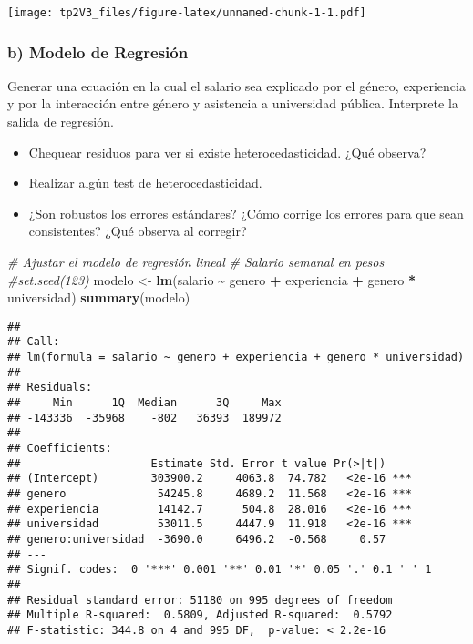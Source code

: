 \documentclass[
]{article}
\newenvironment{Shaded}{\begin{snugshade}}{\end{snugshade}}
\newcommand{\CommentTok}[1]{\textcolor[rgb]{0.56,0.35,0.01}{\textit{#1}}}
\newcommand{\FunctionTok}[1]{\textcolor[rgb]{0.13,0.29,0.53}{\textbf{#1}}}
\newcommand{\NormalTok}[1]{#1}
\newcommand{\OtherTok}[1]{\textcolor[rgb]{0.56,0.35,0.01}{#1}}
\newcommand{\SpecialCharTok}[1]{\textcolor[rgb]{0.81,0.36,0.00}{\textbf{#1}}}
\providecommand{\tightlist}{%
  \setlength{\itemsep}{0pt}\setlength{\parskip}{0pt}}
\begin{document}
\texttt{[image: tp2V3\_files/figure-latex/unnamed-chunk-1-1.pdf]}

\subsubsection{\texorpdfstring{\textbf{b) Modelo de
Regresión}}{b) Modelo de Regresión}}\label{b-modelo-de-regresiuxf3n}

Generar una ecuación en la cual el salario sea explicado por el género,
experiencia y por la interacción entre género y asistencia a universidad
pública. Interprete la salida de regresión.

\begin{itemize}
\tightlist
\item
  Chequear residuos para ver si existe heterocedasticidad. ¿Qué observa?
\item
  Realizar algún test de heterocedasticidad.
\item
  ¿Son robustos los errores estándares? ¿Cómo corrige los errores para
  que sean consistentes? ¿Qué observa al corregir?
\end{itemize}

\begin{Shaded}
\begin{Highlighting}[]
\CommentTok{\# Ajustar el modelo de regresión lineal}
\CommentTok{\# Salario semanal en pesos}
\CommentTok{\#set.seed(123)}
\NormalTok{modelo }\OtherTok{\textless{}{-}} \FunctionTok{lm}\NormalTok{(salario }\SpecialCharTok{\textasciitilde{}}\NormalTok{ genero }\SpecialCharTok{+}\NormalTok{ experiencia }\SpecialCharTok{+}\NormalTok{ genero }\SpecialCharTok{*}\NormalTok{ universidad)}
\FunctionTok{summary}\NormalTok{(modelo)}
\end{Highlighting}
\end{Shaded}

\begin{verbatim}
## 
## Call:
## lm(formula = salario ~ genero + experiencia + genero * universidad)
## 
## Residuals:
##     Min      1Q  Median      3Q     Max 
## -143336  -35968    -802   36393  189972 
## 
## Coefficients:
##                    Estimate Std. Error t value Pr(>|t|)    
## (Intercept)        303900.2     4063.8  74.782   <2e-16 ***
## genero              54245.8     4689.2  11.568   <2e-16 ***
## experiencia         14142.7      504.8  28.016   <2e-16 ***
## universidad         53011.5     4447.9  11.918   <2e-16 ***
## genero:universidad  -3690.0     6496.2  -0.568     0.57    
## ---
## Signif. codes:  0 '***' 0.001 '**' 0.01 '*' 0.05 '.' 0.1 ' ' 1
## 
## Residual standard error: 51180 on 995 degrees of freedom
## Multiple R-squared:  0.5809, Adjusted R-squared:  0.5792 
## F-statistic: 344.8 on 4 and 995 DF,  p-value: < 2.2e-16
\end{verbatim}
\end{document}
